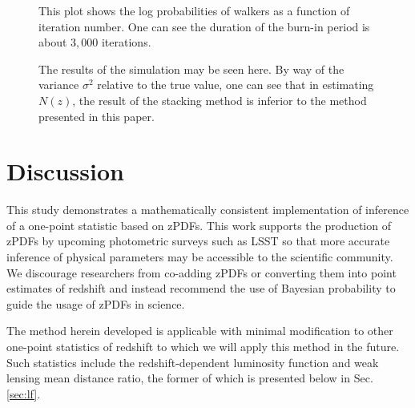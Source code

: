 \documentclass[preprint]{aastex}
\newcommand{\textul}{\underline}
\begin{document}
\begin{figure}
\caption{This plot shows the log probabilities of walkers as a function of iteration number.  One can see the duration of the burn-in period is about $3,000$ iterations.}
\label{fig:realprob}
\end{figure}

\begin{figure}
\caption{The results of the simulation may be seen here.  By way of the variance $\sigma^{2}$ relative to the true value, one can see that in estimating $N(z)$, the result of the stacking method is inferior to the method presented in this paper.}
\label{fig:realparam}
\end{figure}



\section{Discussion}
\label{sec:disc}

This study demonstrates a mathematically consistent implementation of inference of a one-point statistic based on zPDFs.  This work supports the production of zPDFs by upcoming photometric surveys such as LSST so that more accurate inference of physical parameters may be accessible to the scientific community.  We discourage researchers from co-adding zPDFs or converting them into point estimates of redshift and instead recommend the use of Bayesian probability to guide the usage of zPDFs in science.

The method herein developed is applicable with minimal modification to other one-point statistics of redshift to which we will apply this method in the future.  Such statistics include the redshift-dependent luminosity function and weak lensing mean distance ratio, the former of which is presented below in Sec. \ref{sec:lf}.
\end{document}
